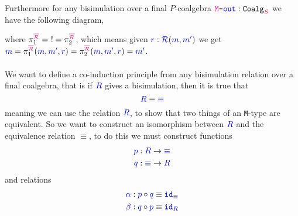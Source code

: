 \documentclass[twoside,11pt,openright]{report}
\newcommand*{\term}[1]{\textcolor{blue!80!black}{#1}}
\newcommand*{\type}[1]{\textcolor{magenta!90!black}{#1}}
\newcommand*{\container}[1]{\textcolor{red}{#1}}
\newcommand*{\coalg}[2]{#1\texttt{-}#2}
\begin{document}
\begin{figure}[h]
  \centering
\end{figure}
\noindent Furthermore for any bisimulation over a final \(P\)-coalgebra \(\coalg{\type{\mathtt{M}}}{\term{\mathtt{out}}}:\mathtt{Coalg}_{\container{S}}\) we have the following diagram,

\begin{figure}[h]
  \centering
\end{figure}
\noindent where \(\pi_1^{\type{\overline{\mathcal{R}}}} = ~! = \pi_2^{\type{\overline{\mathcal{R}}}}\), which means given \(\term{r} : \term{\mathcal{R}}(\term{m},\term{m'})\) we get \(\term{m} = \pi_1^{\type{\overline{\mathcal{R}}}} (\term{m}, \term{m'}, \term{r}) = \pi_2^{\type{\overline{\mathcal{R}}}} (\term{m}, \term{m'}, \term{r}) = \term{m'}\).
\\ \\
We want to define a co-induction principle from any bisimulation relation over a final coalgebra, that is if \(\term{R}\) gives a bisimulation, then it is true that
\begin{equation}
  \term{R} \equiv \term{\equiv}
\end{equation}
meaning we can use the relation \(\term{R}\), to show that two things of an \texttt{M}-type are equivalent. So we want to construct an isomorphism between \(\term{R}\) and the equivalence relation \(\equiv\), to do this we must construct functions
\begin{align}
  \term{p} &: \term{R} \rightarrow \term{\equiv} \\
  \term{q} &: \term{\equiv} \rightarrow \term{R}
\end{align}
and relations
\begin{align}
  \term{\alpha} &: \term{p} \circ \term{q} \equiv \term{\mathtt{id}_{\equiv}} \\
  \term{\beta} &: \term{q} \circ \term{p} \equiv \term{\mathtt{id}_{R}}
\end{align}
\end{document}
